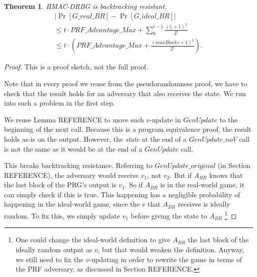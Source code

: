 \documentclass[12pt,lot, lof]{puthesis}
\newenvironment{game}
{ \begin{itemize}[noitemsep,nolistsep] 
}
{ \end{itemize}                  }
\newcommand{\s} {\textrm{ }}
\newcommand{\f}{\frac}
\newtheorem{thm}{Theorem}
\begin{document}
{%

\begin{thm}\label{thm:br} HMAC-DRBG is backtracking resistant. 
  \begin{gather*}
|\Pr[G\_real\_BR] - \Pr[G\_ideal\_BR]| \\
\leq t \cdot PRF\_Advantage\_Max + \sum_{0}^{t-1} \f{(l_i+1)^2}{2^c} \\ 
\leq t \cdot (PRF\_Advantage\_Max + \f{(maxBlocks + 1)^2}{2^c}).
\end{gather*}

\end{thm}
\begin{proof} This is a proof sketch, not the full proof.

Note that in every proof we reuse from the pseudorandomness proof, we have to check that the result holds for an adversary that also receives the state. We run into such a problem in the first step.

We reuse Lemma REFERENCE to move each $v$-update in $GenUpdate$ to the beginning of the next call. Because this is a program equivalence proof, the result holds as-is on the output. However, the \emph{state} at the end of a $GenUpdate\_noV$ call is not the same as it would be at the end of a $GenUpdate$ call. 

This breaks backtracking resistance. Referring to $GenUpdate\_original$ (in Section REFERENCE), the adversary would receive $v_1$, not $v_2$. But if $A_{BR}$ knows that the last block of the PRG's output is $v_1$. So if $A_{BR}$ is in the real-world game, it can simply check if this is true. This happening has a negligible probability of happening in the ideal-world game, since the $v$ that $A_{BR}$ receives is ideally random. To fix this, we simply update $v_1$ before giving the state to $A_{BR}$ \footnote{One could change the ideal-world definition to give $A_{BR}$ the last block of the ideally random output as $v$, but that would weaken the definition. Anyway, we still need to fix the $v$-updating in order to rewrite the game in terms of the PRF adversary, as discussed in Section REFERENCE.}


\end{proof}}
\end{document}
